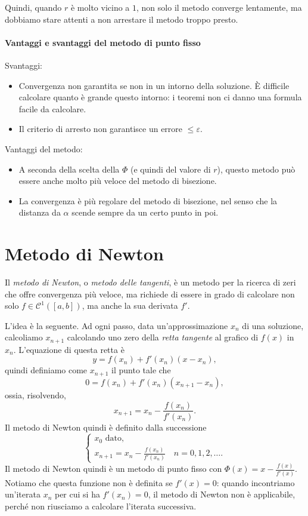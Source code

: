 \documentclass[a4paper]{report}
\theoremstyle{definiton}
\theoremstyle{remark}
\begin{document}
Quindi, quando $r$ è molto vicino a $1$, non solo il metodo converge lentamente, ma dobbiamo stare attenti a non arrestare il metodo troppo presto.

\paragraph{Vantaggi e svantaggi del metodo di punto fisso}

Svantaggi:
\begin{itemize}
    \item Convergenza non garantita se non in un intorno della soluzione. È difficile calcolare quanto è grande questo intorno: i teoremi non ci danno una formula facile da calcolare.
    \item Il criterio di arresto non garantisce un errore $\leq \varepsilon$.
\end{itemize}
Vantaggi del metodo:
\begin{itemize}
    \item A seconda della scelta della $\Phi$ (e quindi del valore di $r$), questo metodo può essere anche molto più veloce del metodo di bisezione.
    \item La convergenza è più regolare del metodo di bisezione, nel senso che la distanza da $\alpha$ scende sempre da un certo punto in poi. 
\end{itemize}


\section{Metodo di Newton}

Il \emph{metodo di Newton}, o \emph{metodo delle tangenti}, è un metodo per la ricerca di zeri che offre convergenza più veloce, ma richiede di essere in grado di calcolare non solo $f \in \mathcal{C}^1([a,b])$, ma anche la sua derivata $f'$.

L'idea è la seguente. Ad ogni passo, data un'approssimazione $x_n$ di una soluzione, calcoliamo $x_{n+1}$ calcolando uno zero della \emph{retta tangente} al grafico di $f(x)$ in $x_n$. L'equazione di questa retta è
\[
y = f(x_n) + f'(x_n) (x- x_n),
\]
quindi definiamo come $x_{n+1}$ il punto tale che
\[
0 = f(x_n) + f'(x_n) (x_{n+1}- x_n),
\]
ossia, risolvendo,
\[
x_{n+1} = x_n - \frac{f(x_n)}{f'(x_n)}.
\]
Il metodo di Newton quindi è definito dalla successione
\[
\begin{cases}
    x_0 \text{ dato},\\
    x_{n+1} = x_n - \frac{f(x_n)}{f'(x_n)} \quad n=0,1,2,\dots.
\end{cases}
\]
Il metodo di Newton quindi è un metodo di punto fisso con $\Phi(x) = x - \frac{f(x)}{f'(x)}$. Notiamo che questa funzione non è definita se $f'(x) = 0$: quando incontriamo un'iterata $x_n$ per cui si ha $f'(x_n) = 0$, il metodo di Newton non è applicabile, perché non riusciamo a calcolare l'iterata successiva.
\end{document}
